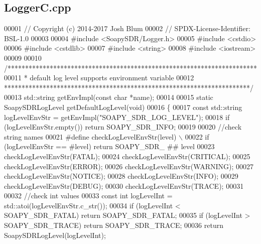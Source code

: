 \subsection{Logger\+C.\+cpp}
\label{LoggerC_8cpp_source}

\begin{DoxyCode}
00001 \textcolor{comment}{// Copyright (c) 2014-2017 Josh Blum}
00002 \textcolor{comment}{// SPDX-License-Identifier: BSL-1.0}
00003 
00004 \textcolor{preprocessor}{#include <SoapySDR/Logger.h>}
00005 \textcolor{preprocessor}{#include <cstdio>}
00006 \textcolor{preprocessor}{#include <cstdlib>}
00007 \textcolor{preprocessor}{#include <string>}
00008 \textcolor{preprocessor}{#include <iostream>}
00009 
00010 \textcolor{comment}{/***********************************************************************}
00011 \textcolor{comment}{ * default log level supports environment variable}
00012 \textcolor{comment}{ **********************************************************************/}
00013 std::string getEnvImpl(\textcolor{keyword}{const} \textcolor{keywordtype}{char} *name);
00014 
00015 \textcolor{keyword}{static} SoapySDRLogLevel getDefaultLogLevel(\textcolor{keywordtype}{void})
00016 \{
00017     \textcolor{keyword}{const} std::string logLevelEnvStr = getEnvImpl(\textcolor{stringliteral}{"SOAPY\_SDR\_LOG\_LEVEL"});
00018     \textcolor{keywordflow}{if} (logLevelEnvStr.empty()) \textcolor{keywordflow}{return} SOAPY_SDR_INFO;
00019 
00020     \textcolor{comment}{//check string names}
00021 \textcolor{preprocessor}{    #define checkLogLevelEnvStr(level) \(\backslash\)}
00022 \textcolor{preprocessor}{        if (logLevelEnvStr == #level) return SOAPY\_SDR\_ ## level}
00023     checkLogLevelEnvStr(FATAL);
00024     checkLogLevelEnvStr(CRITICAL);
00025     checkLogLevelEnvStr(ERROR);
00026     checkLogLevelEnvStr(WARNING);
00027     checkLogLevelEnvStr(NOTICE);
00028     checkLogLevelEnvStr(INFO);
00029     checkLogLevelEnvStr(DEBUG);
00030     checkLogLevelEnvStr(TRACE);
00031 
00032     \textcolor{comment}{//check int values}
00033     \textcolor{keyword}{const} \textcolor{keywordtype}{int} logLevelInt = std::atoi(logLevelEnvStr.c\_str());
00034     \textcolor{keywordflow}{if} (logLevelInt < SOAPY_SDR_FATAL) \textcolor{keywordflow}{return} SOAPY_SDR_FATAL;
00035     \textcolor{keywordflow}{if} (logLevelInt > SOAPY_SDR_TRACE) \textcolor{keywordflow}{return} SOAPY_SDR_TRACE;
00036     \textcolor{keywordflow}{return} SoapySDRLogLevel(logLevelInt);

\end{DoxyCode}
